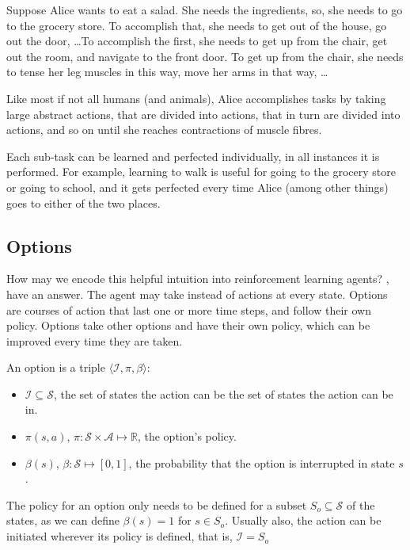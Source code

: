 Suppose Alice wants to eat a salad. She needs the ingredients, so, she needs to
go to the grocery store. To accomplish that, she needs to get out of the house,
go out the door, \dots To accomplish the first, she needs to get up from the
chair, get out the room, and navigate to the front door. To get up from the
chair, she needs to tense her leg muscles in this way, move her arms in that
way, \dots

Like most if not all humans (and animals), Alice accomplishes tasks by taking
large abstract actions, that are divided into actions, that in turn are divided
into actions, and so on until she reaches contractions of muscle fibres.

Each sub-task can be learned and perfected individually, in all instances it is
performed. For example, learning to walk is useful for going to the grocery
store or going to school, and it gets perfected every time Alice (among other
things) goes to either of the two places.

\subsection{Options}

How may we encode this helpful intuition into reinforcement learning agents?
\cite{sutton1999between}, have an answer. The agent may take
 instead of actions at every state. Options are courses of
action that last one or more time steps, and follow their own policy. Options take
other options and have their own policy, which can be improved every time they
are taken.

An option is a triple $\langle \mathcal{I}, \pi, \beta \rangle$:
\begin{itemize}
  \item $\mathcal{I} \subseteq \mathcal{S}$, the set of states the action can be
     the set of states the action can be
     in.
  \item $\pi(s, a)$, $\pi : \mathcal{S} \times \mathcal{A} \mapsto \mathbb{R}$,
the option's policy.
  \item $\beta(s)$, $\beta : \mathcal{S} \mapsto [0, 1]$, the probability that
the option is interrupted in state $s$.
\end{itemize}

The policy for an option only needs to be defined for a subset $S_o \subseteq
\mathcal{S}$ of the states, as we can define $\beta(s) = 1$ for $s \in S_o$.
Usually also, the action can be initiated wherever its policy is defined, that
is, $\mathcal{I} = S_o$


